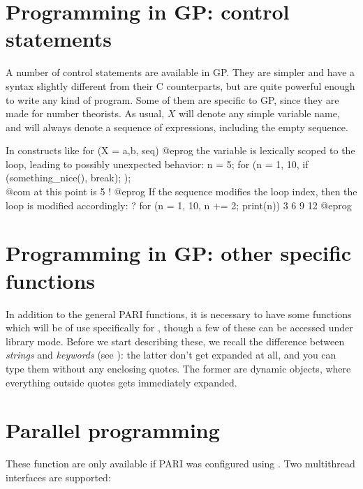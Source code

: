 
\section{Programming in GP: control statements}
\label{se:programming}

  A number of control statements are available in GP. They are simpler and
have a syntax slightly different from their C counterparts, but are quite
powerful enough to write any kind of program. Some of them are specific to
GP, since they are made for number theorists. As usual, $X$ will denote any
simple variable name, and  will always denote a sequence of
expressions, including the empty sequence.

 In constructs like
\bprog
    for (X = a,b, seq)
@eprog\noindent
the variable  is lexically scoped to the loop, leading to possibly
unexpected behavior:
\bprog
    n = 5;
    for (n = 1, 10,
      if (something_nice(), break);
    );
    \\ @com at this point  is 5 !
@eprog\noindent
If the sequence  modifies the loop index, then the loop
is modified accordingly:
\bprog
    ? for (n = 1, 10, n += 2; print(n))
    3
    6
    9
    12
@eprog


\section{Programming in GP: other specific functions}
\label{se:gp_program}

  In addition to the general PARI functions, it is necessary to have some
functions which will be of use specifically for , though a few of these can
be accessed under library mode. Before we start describing these, we recall
the difference between \emph{strings} and \emph{keywords} (see
): the latter don't get expanded at all, and you can type
them without any enclosing quotes. The former are dynamic objects, where
everything outside quotes gets immediately expanded.


\section{Parallel programming}

These function are only available if PARI was configured using
. Two multithread interfaces are supported:


